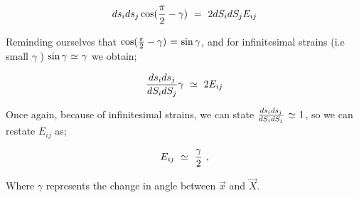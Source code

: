 \documentclass{article}
\begin{document}
\begin{equation} \label{eb-eq-1-98}
ds_i ds_j \cos(\frac{\pi}{2} - \gamma) \hspace{0.125cm} = \hspace{0.125cm} 2 dS_i dS_j E_{i j} 
\end{equation} 

Reminding ourselves that \begin{math} \cos(\frac{\pi}{2} - \gamma) \hspace{0.025cm} = \hspace{0.025cm} \sin{ \gamma } \end{math}, and for infinitesimal strains (i.e small  \begin{math} \gamma \end{math} ) \begin{math} \sin{ \gamma } \hspace{0.025cm} \simeq \hspace{0.025cm} \gamma \end{math} we obtain;

\begin{equation} \label{eb-eq-1-99}
\frac{ds_i ds_j}{dS_i dS_j} \gamma \hspace{0.125cm} \simeq \hspace{0.125cm} 2 E_{i j} 
\end{equation} 

Once again, because of infinitesimal strains, we can state \begin{math} \frac{ds_i ds_j}{dS_i dS_j} \hspace{0.025cm} \simeq \hspace{0.025cm} 1 \end{math}, so we can restate \begin{math} E_{i j} \end{math} as;

\begin{equation} \label{eb-eq-1-100}
E_{i j} \hspace{0.125cm} \simeq \hspace{0.125cm} \frac{\gamma}{2} \hspace{0.125cm} ,
\end{equation} 

Where \begin{math} \gamma \end{math} represents the change in angle between \begin{math} \vec{x} \end{math} and \begin{math} \vec{X} \end{math}.
\end{document}

